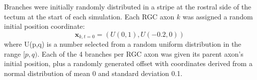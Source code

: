 \documentclass[11pt, a4paper]{article}
\begin{document}
Branches were initially randomly distributed in a stripe at the rostral side
of the tectum at the start of each simulation. Each RGC axon $k$ was assigned a
random initial position coordinate:
\begin{equation}\label{e:ic}
\mathbf{x}_{k,t=0} = (U(0,1), U(-0.2,0))
\end{equation}
where U(p,q) is a number selected from a random uniform distribution in the
range $[p,q)$. Each of the 4 branches per RGC axon was given its parent
axon's initial position, plus a randomly generated offset with coordinates
derived from a normal distribution of mean 0 and standard deviation 0.1.
\end{document}

